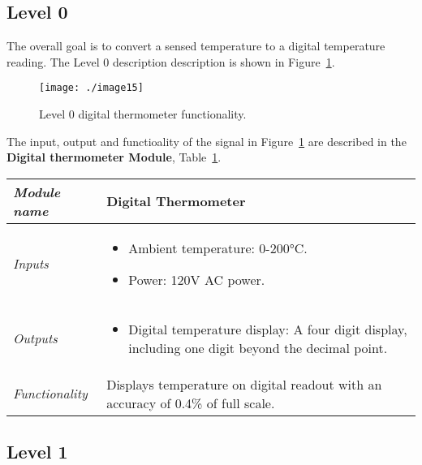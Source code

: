\subsection*{Level 0}
\label{subsection:level-0-2}

The overall goal is to convert a sensed temperature to a digital
temperature reading. The Level 0 description description is 
shown in Figure~\ref{figure:digitalTermLevel0}.

\begin{figure}[h]
\centering
\texttt{[image: ./image15]}
\caption{Level 0 digital thermometer functionality.}
\label{figure:digitalTermLevel0}
\end{figure}


The input, output and functioality of the signal in Figure~\ref{figure:digitalTermLevel0} are
described in the \textbf{Digital thermometer Module}, Table~\ref{table:digitalThermLevel0}.

\begin{table}[h]
\label{table:digitalThermLevel0}
\begin{tabular}{|l|m{10cm}|}
\hline
\emph{Module name} & Digital Thermometer \\ \hline
\emph{Inputs} & 
\begin{itemize}
\item Ambient temperature: 0-200°C.
\item Power: 120V AC power.
\end{itemize}  \\ \hline
\emph{Outputs} & 
\begin{itemize}
\item
  Digital temperature display: A four digit display, including one digit
  beyond the decimal point.
\end{itemize} \\ \hline
\emph{Functionality} & Displays temperature on digital readout with an
accuracy of 0.4\% of full scale. \\ \hline
\end{tabular}
\end{table}

\subsection*{Level 1}
\label{subsection:level-1-2}


